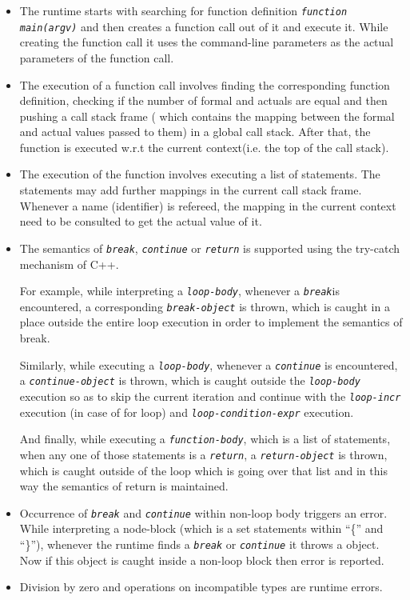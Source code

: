 \documentclass[12,twoside]{article}
\begin{document}
\begin{itemize}

  \item The runtime starts with searching for function definition
  {\tt\emph{function main(argv)}} and then creates a function call out of it and 
  execute it.  While creating the function call it uses the command-line 
  parameters as the actual parameters of the function call.

  \item The execution of a function call involves finding the corresponding 
  function definition, checking if the number of formal and actuals are equal 
  and then pushing a call stack frame ( which contains the mapping between the 
      formal and actual values passed to them) in a global call stack. After 
  that, the function
  is executed w.r.t the current context(i.e. the top of the call stack).

  \item The execution of the function involves executing a list of statements.
  The statements may add further mappings in the current call stack frame.
  Whenever a name (identifier) is refereed, the mapping in the current context 
  need to be consulted to get the actual value of it. 

  \item The semantics of {\tt\emph{break}}, {\tt\emph{continue}} or 
{\tt\emph{return}} is supported using the try-catch mechanism of C++.

  For example, while interpreting a {\tt\emph{loop-body}}, whenever a 
{\tt\emph{break}}is encountered, a corresponding {\tt\emph{break-object}} is 
thrown, which is caught in a place outside the entire loop execution in order to 
implement the semantics of break. 

  Similarly, while executing a {\tt\emph{loop-body}}, whenever a 
{\tt\emph{continue}} is encountered, a {\tt\emph{continue-object}} is thrown, 
  which is caught outside
  the {\tt\emph{loop-body}} execution so as to skip the current iteration and 
  continue with the {\tt\emph{loop-incr}} execution (in case of for loop) and 
{\tt\emph{loop-condition-expr}} execution.

  And finally, while executing a  {\tt\emph{function-body}}, which is a list
  of statements, when any one of those statements is a {\tt\emph{return}}, a 
{\tt\emph{return-object}} is thrown, which is caught outside of the loop
  which is going over that list and in this way the semantics of return is 
  maintained.
  
  \item Occurrence of {\tt\emph{break}} and {\tt\emph{continue}} within non-loop
    body triggers an error. While interpreting a node-block (which is a set 
        statements within ``\{'' and ``\}''), whenever the runtime finds a 
{\tt\emph{break}} or  {\tt\emph{continue}} it throws a object. Now if this 
object is caught
  inside a non-loop block then error is reported.

  \item Division by zero and operations on incompatible types are runtime 
  errors.  
  
  \end{itemize}
\end{document}

